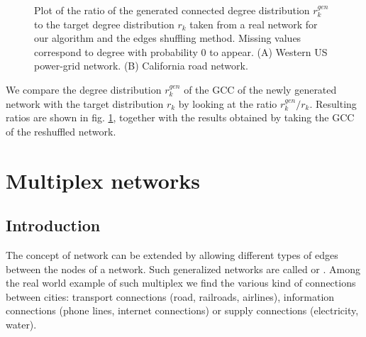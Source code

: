 \documentclass[
11pt, %
english, %
singlespacing, %
nolistspacing, %
liststotoc, %
headsepline, %
]{MastersDoctoralThesis} %
\begin{document}
\begin{figure}
	\hfill
	\caption{Plot of the ratio of the generated connected degree distribution $r^{gen}_k$ to the target degree distribution $r_k$ taken from a real network for our algorithm and the edges shuffling method. Missing values correspond to degree with probability $0$ to appear. (A) Western US power-grid network. (B) California road network.}
	\label{Figure: Real examples}
\end{figure}

We compare the degree distribution $r^{gen}_k$ of the GCC of the newly generated network with the target distribution $r_k$ by looking at the ratio $r^{gen}_k / r_k$. Resulting ratios are shown in fig. \ref{Figure: Real examples}, together with the results obtained by taking the GCC of the reshuffled network.



\chapter{Multiplex networks}
\label{Section: Multiplex networks}

\section{Introduction}

The concept of network can be extended by allowing different types of edges between the nodes of a network. Such generalized networks are called  or . Among the real world example of such multiplex we find the various kind of connections between cities: transport connections (road, railroads, airlines), information connections (phone lines, internet connections) or supply connections (electricity, water).
\end{document}
